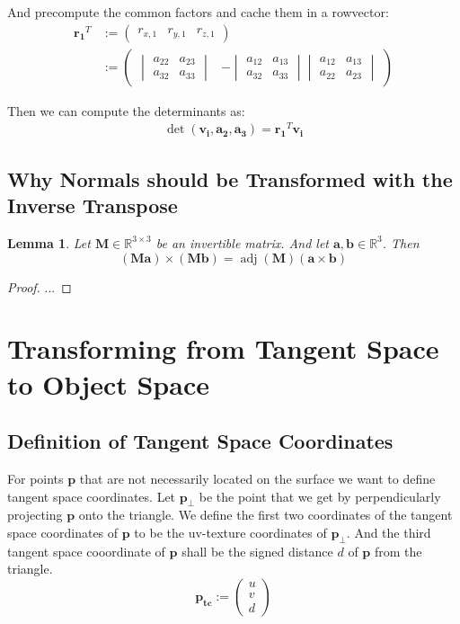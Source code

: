 \documentclass{article}
\newtheorem{lemma}{Lemma}
\newcommand{\R}{\mathbb{R}}
\newcommand{\vctr}[1]{\mathbf{#1}}
\newcommand{\point}[1]{\mathbf{#1}}
\newcommand{\mat}[1]{\mathbf{#1}}
\newcommand{\colvec}[1]{\begin{pmatrix}#1\end{pmatrix}}
\newcommand{\rowvec}[1]{\begin{pmatrix}#1\end{pmatrix}}
\newcommand{\matCol}[1]{\vctr{a_{#1}}}
\DeclareMathOperator{\adj}{adj}
\begin{document}
And precompute the common factors and cache them in a rowvector:
\begin{align*}
\vctr{r_1}^T &:= \rowvec{r_{x, 1} & r_{y, 1} & r_{z, 1}} \\
&:= 
\rowvec{
\begin{vmatrix}
a_{22} & a_{23} \\
a_{32} & a_{33}
\end{vmatrix} &
- \begin{vmatrix}
a_{12} & a_{13} \\
a_{32} & a_{33}
\end{vmatrix}
\begin{vmatrix}
a_{12} & a_{13} \\
a_{22} & a_{23}
\end{vmatrix}}
\end{align*}

Then we can compute the determinants as:
\begin{align*}
\det(\vctr{v_i}, \matCol{2}, \matCol{3}) = \vctr{r_1}^T \vctr{v_i}
\end{align*}



\subsection{Why Normals should be Transformed with the Inverse Transpose}

\begin{lemma}
Let \(\mat{M} \in \R^{3\times 3}\) be an invertible matrix. And let \(\vctr{a}, \vctr{b} \in \R^3\). Then
\[
(\mat{M}\vctr{a})\times(\mat{M}\vctr{b}) = \adj(\mat{M}) (\vctr{a} \times \vctr{b})
\]
\end{lemma}
\begin{proof}
 ...
\end{proof}


\section{Transforming from Tangent Space to Object Space}

\subsection{Definition of Tangent Space Coordinates}
For points \(\point{p}\) that are not necessarily located on the surface we want to define tangent space coordinates. Let \(\point{p_\perp}\) be the point that we get by perpendicularly projecting \(\point{p}\) onto the triangle. We define the first two coordinates of the tangent space coordinates of \(\point{p}\) to be the uv-texture coordinates of \(\point{p_\perp}\). And the third tangent space cooordinate of \(\point{p}\) shall be the signed distance \(d\) of \(\point{p}\) from the triangle.
\begin{equation*}
 \point{p_{tc}} := \colvec{u \\ v \\ d}
\end{equation*}
\end{document}
